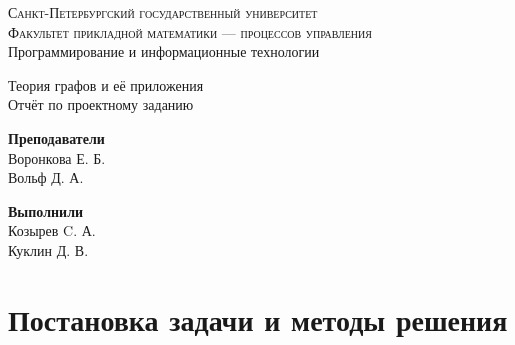 \documentclass[11pt]{article}
\begin{document}
	
	\begin{titlepage}
	\begin{figure}[t]
	\end{figure}

	\begin{center}
		\textsc{\Large{Санкт-Петербургский государственный университет\\}}
		\textsc{\Large{Факультет прикладной математики --- процессов управления\\}}
		\textnormal{\Large{Программирование и информационные технологии\\}}
		\vspace{23mm}
		
		\Huge{Теория графов и её приложения}\\
		\LARGE{Отчёт по проектному заданию}
	\end{center}
	\vspace{16mm}
		
	\begin{minipage}[t]{0.38\textwidth}
		\textnormal{\large{\textbf{Преподаватели}\\}}
		\large{Воронкова Е. Б.}\\
		\large{Вольф Д. А.}
	\end{minipage}\hfill\begin{minipage}[t]{0.38\textwidth}\raggedleft
		\textnormal{\large{\textbf{Выполнили\\}}}
		\large{Козырев C. А.}\\
		\large{Куклин Д. В.}
	\end{minipage}
	\vspace{16mm}
		
	\pagebreak
    \end{titlepage}
    
    \tableofcontents
    \pagebreak
    
    \section{Постановка задачи и методы решения}
    
\end{document}
